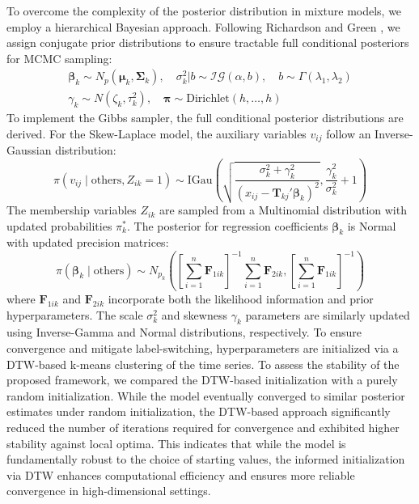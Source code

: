 \documentclass[twoside]{article}
\begin{document}
To overcome the complexity of the posterior distribution in mixture models, we employ a hierarchical Bayesian approach. Following Richardson and Green \citep{richardson1997}, we assign conjugate prior distributions to ensure tractable full conditional posteriors for MCMC sampling:
\begin{align*}
\boldsymbol{\beta}_k \sim N_p (\boldsymbol{\mu}_k, \boldsymbol{\Sigma}_k), \quad \sigma_k^2 | b \sim \mathcal{IG}(\alpha, b), \quad b \sim \Gamma(\lambda_1, \lambda_2) \\
\gamma_k \sim N(\zeta_k, \tau_k^2), \quad \boldsymbol{\pi} \sim \text{Dirichlet}(h, \dots,h)
\end{align*}
To implement the Gibbs sampler, the full conditional posterior distributions are derived. For the Skew-Laplace model, the auxiliary variables $v_{ij}$ follow an Inverse-Gaussian distribution:
\begin{equation}
\pi(v_{ij} \mid \text{others}, Z_{ik}=1) \sim \text{IGau} \left( \sqrt{\frac{\sigma_k^2 + \gamma_k^2}{(x_{ij} - \mathbf{T}_{kj}' \boldsymbol{\beta}_k)^2}}, \frac{\gamma_k^2}{\sigma_k^2} + 1 \right)
\end{equation}
The membership variables $Z_{ik}$ are sampled from a Multinomial distribution with updated probabilities $\pi_k^*$. The posterior for regression coefficients $\boldsymbol{\beta}_k$ is Normal with updated precision matrices:
\begin{equation}
\pi(\boldsymbol{\beta}_k \mid \text{others}) \sim N_{p_k} \left( \left[ \sum_{i=1}^n \mathbf{F}_{1ik} \right]^{-1} \sum_{i=1}^n \mathbf{F}_{2ik}, \left[ \sum_{i=1}^n \mathbf{F}_{1ik} \right]^{-1} \right)
\end{equation}
where $\mathbf{F}_{1ik}$ and $\mathbf{F}_{2ik}$ incorporate both the likelihood information and prior hyperparameters. The scale $\sigma_k^2$ and skewness $\gamma_k$ parameters are similarly updated using Inverse-Gamma and Normal distributions, respectively. To ensure convergence and mitigate label-switching, hyperparameters are initialized via a DTW-based k-means clustering of the time series.  To assess the stability of the proposed framework, we compared the DTW-based initialization with a purely random initialization. While the model eventually converged to similar posterior estimates under random initialization, the DTW-based approach significantly reduced the number of iterations required for convergence and exhibited higher stability against local optima. This indicates that while the model is fundamentally robust to the choice of starting values, the informed initialization via DTW enhances computational efficiency and ensures more reliable convergence in high-dimensional settings.
\end{document}

